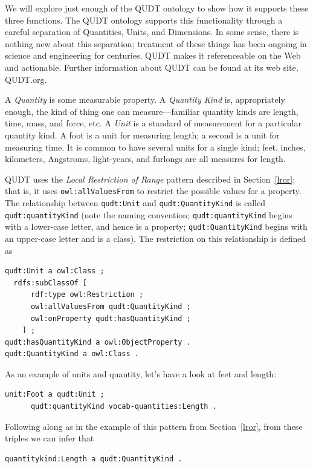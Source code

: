 We will explore just enough of the QUDT ontology to show how it supports
these three functions. The QUDT ontology supports this functionality
through a careful separation of Quantities, Units, and Dimensions. In
some sense, there is nothing new about this separation; treatment of
these things has been ongoing in science and engineering for centuries.
QUDT makes it referenceable on the Web and actionable. Further
information about QUDT can be found at its web site, QUDT.org.

A \emph{Quantity} is some measurable property. A \emph{Quantity Kind} is,
appropriately enough, the kind of thing one can measure---familiar
quantity kinds are length, time, mass, and force, etc. A \emph{Unit} is a
standard of measurement for a particular quantity kind. A foot is a unit
for measuring length; a second is a unit for measuring time. It is
common to have several units for a single kind; feet, inches,
kilometers, Angstroms, light-years, and furlongs are all measures for
length.

QUDT uses the \emph{Local Restriction of Range} pattern described in Section~\ref{lror}; that is, it uses
\texttt{owl:allValuesFrom} to restrict the possible values for a property. The
relationship between \texttt{qudt:Unit} and \texttt{qudt:QuantityKind} is called
\texttt{qudt:quantityKind} (note the naming convention; \texttt{qudt:quantityKind} begins
with a lower-case letter, and hence is a property; \texttt{qudt:QuantityKind}
begins with an upper-case letter and is a class). The restriction on
this relationship is defined as

\begin{lstlisting}
qudt:Unit a owl:Class ;
  rdfs:subClassOf [
      rdf:type owl:Restriction ;
      owl:allValuesFrom qudt:QuantityKind ;
      owl:onProperty qudt:hasQuantityKind ;
    ] ;
qudt:hasQuantityKind a owl:ObjectProperty .
qudt:QuantityKind a owl:Class .
\end{lstlisting}


As an example of units and quantity, let's have a look at feet and
length:

\begin{lstlisting}
unit:Foot a qudt:Unit ;
      qudt:quantityKind vocab-quantities:Length .
\end{lstlisting}

Following along as in the example of this pattern from Section~\ref{lror}, from
these triples we can infer that

\begin{lstlisting}
quantitykind:Length a qudt:QuantityKind .
\end{lstlisting}

